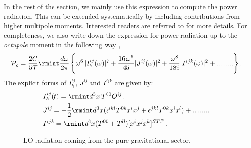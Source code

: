 In the rest of the section, we mainly use this expression to compute the power radiation. This can be extended systematically by including contributions from higher multipole moments. Interested readers are referred to \cite{Goldberger:2004jt} for more details. For completeness, we also write down the expression for power radiation up to the \textit{octupole} moment in the following way \cite{Goldberger:2004jt},
\begin{align}
    \begin{split}
        \mathcal{P}_{g}=\frac{2G}{5\mathcal{T}}\rmint \frac{d\omega}{2\pi}\, \Bigg\{\omega^6\, |{I}_{h}^{ij}(\omega)|^2+\frac{16\,\omega^6}{45}|J^{ij}(\omega)|^2+\frac{\omega^8}{189}|I^{ijk}(\omega)|^2+.........\Bigg\}\,.
        \label{5.65}
    \end{split}
\end{align}
 \textcolor{black}{ The explicit forms of ${I}^{ij}_{h}, \,J^{ij}$ and $I^{ijk}$ are given by:
\begin{align}
    \begin{split}
      &   {I}^{ij}_{h}(t)=\rmint d^3x \,T^{00}Q^{ij}.\\ &
      J^{ij}=-\frac{1}{2}\rmint d^3x (\epsilon^{ikl}T^{0k}x^ix^j+\epsilon^{jkl}T^{0k}x^ix^l)+.........\\ &
      I^{ijk}=\rmint d^3x (T^{00}+T^{ll})[x^ix^jx^k]^{STF}\,.
    \end{split}
\end{align}
}
\begin{figure}[b!]
\centering
{}
\caption{LO radiation coming from the pure gravitational sector.}
\label{figpq}
\end{figure}


